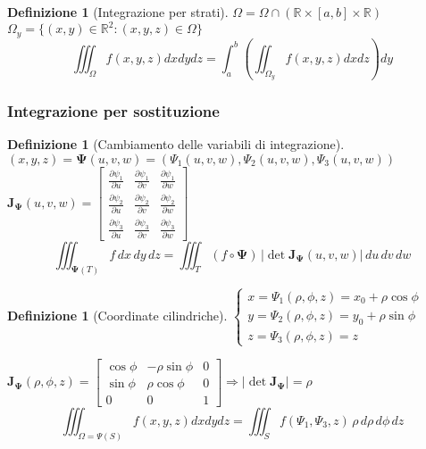 \documentclass[a4paper,12pt]{report}
\theoremstyle{mystyle}
\newtheorem{definition}[theorem]{Definizione}
\begin{document}
\begin{definition}[Integrazione per strati]
\(\Omega = \Omega \cap (\mathbb R \times [a,b] \times \mathbb R)\)\\
\(\Omega_y = \{(x,y)\in \mathbb R^2 : (x,y,z) \in \Omega\}\)
\[
    \iiint _\Omega f (x,y,z)dxdydz= \int_a^b \left(\iint_{\Omega_y} f(x,y,z)dxdz\right)dy
\]
\end{definition}

\subsubsection{Integrazione per sostituzione}
\begin{definition}[Cambiamento delle variabili di integrazione]
\((x,y,z) = \mathbf{\Psi}(u,v,w) = (\Psi_1(u,v,w), \Psi_2 (u,v,w), \Psi_3 (u,v,w))\)\\
\(
    \mathbf{J_\Psi}(u,v,w) =
    \begin{bmatrix}
        \frac{\partial \psi_1}{\partial u} & \frac{\partial \psi_1}{\partial v} & \frac{\partial \psi_1}{\partial w} \\
        \frac{\partial \psi_2}{\partial u} & \frac{\partial \psi_2}{\partial v} & \frac{\partial \psi_2}{\partial w} \\
        \frac{\partial \psi_3}{\partial u} & \frac{\partial \psi_3}{\partial v} & \frac{\partial \psi_3}{\partial w}
    \end{bmatrix}
\)
\[
    \iiint_{\mathbf{\Psi}(T)} f \, dx\,dy\,dz = \iiint_T (f \circ \mathbf{\Psi}) \, \lvert \det \mathbf{J_\Psi }(u,v,w) \rvert \, du \, dv \, dw
\]
\end{definition}

\begin{definition}[Coordinate cilindriche]
\(
    \begin{cases}
        x = \Psi_1 (\rho,\phi,z) = x_0 + \rho \cos \phi \\
        y = \Psi_2 (\rho,\phi,z) = y_0 + \rho \sin \phi \\
        z = \Psi_3 (\rho, \phi, z) = z
    \end{cases}
\)

\(\mathbf{J_\Psi}(\rho,\phi,z) = \begin{bmatrix}
        \cos \phi & - \rho \sin \phi & 0 \\
        \sin \phi & \rho \cos \phi   & 0 \\
        0         & 0                & 1
    \end{bmatrix}
    \Rightarrow \lvert \det \mathbf{J_\Psi} \rvert = \rho
\)
\[
    \iiint_{\Omega = \Psi(S)} f(x,y,z) dx dydz = \iiint_S f (\Psi_1, \Psi_3,z)\, \rho \,d\rho \,d \phi\, dz
\]
\end{definition}
\end{document}
